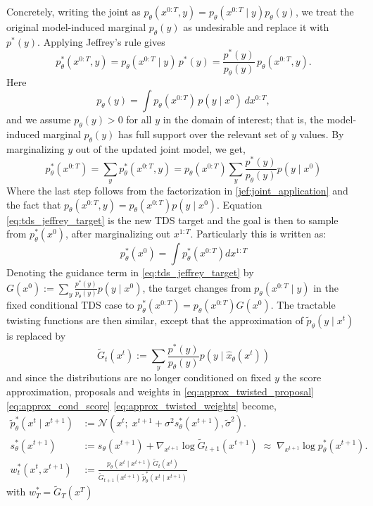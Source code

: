 Concretely, writing the joint as $p_\theta(x^{0:T},y)=p_\theta(x^{0:T}\mid y)p_\theta(y)$, we treat the original model-induced marginal $p_\theta(y)$ as undesirable and replace it with $p^*(y)$. Applying Jeffrey's rule gives
\begin{equation}
	p^*_\theta(x^{0:T},y)=p_\theta(x^{0:T}\mid y)\,p^*(y)
	=\frac{p^*(y)}{p_\theta(y)}\,p_\theta(x^{0:T},y).
	\label{jef:joint_application}
\end{equation}
Here
\[
	p_\theta(y)=\int p_\theta(x^{0:T})\,p(y\mid x^0)\,dx^{0:T},
\]
and we assume $p_\theta(y)>0$ for all $y$ in the domain of interest; that is, the model-induced marginal $p_\theta(y)$ has full support over the relevant set of $y$ values. By marginalizing $y$ out of the updated joint model, we get,
\begin{equation}
	p^*_\theta(x^{0:T}) = \sum_y p^*_\theta(x^{0:T},y) = p_\theta(x^{0:T})\sum_y\frac{p^*(y)}{p_\theta(y)}p(y \mid x^0) 
	\label{eq:tds_jeffrey_target}
\end{equation}
Where the last step follows from the factorization in \eqref{jef:joint_application} and the fact that $p_\theta(x^{0:T},y) = p_\theta(x^{0:T}) p(y \mid x^0)$. Equation \eqref{eq:tds_jeffrey_target} is the new TDS target and the goal is then to sample from $p^*_\theta(x^0)$, after marginalizing out $x^{1:T}$. Particularly this is written as:
\begin{equation}
	p^*_\theta(x^0) = \int p^*_\theta(x^{0:T})dx^{1:T}
\end{equation}
Denoting the guidance term in \eqref{eq:tds_jeffrey_target} by $G(x^0) := \sum_y\frac{p^*(y)}{p_\theta(y)}p(y \mid x^0)$, the target changes from $p_\theta(x^{0:T} \mid y)$ in the fixed conditional TDS case to $p^*_\theta(x^{0:T}) = p_\theta(x^{0:T})G(x^0)$. The tractable twisting functions are then similar, except that the approximation of $\tilde{p}_\theta(y \mid x^t)$ is replaced by
\begin{equation}
	\tilde{G}_t(x^t) := \sum_y\frac{p^*(y)}{p_\theta(y)}p(y \mid \hat{x}_\theta(x^t)) 
\end{equation}
and since the distributions are no longer conditioned on fixed $y$ the score approximation, proposals and weights in \ref{eq:approx_twisted_proposal} \ref{eq:approx_cond_score} \ref{eq:approx_twisted_weights} become,
\begin{align}
	\tilde p_\theta^*(x^t\mid x^{t+1}) &:= \mathcal N\!\left( x^t;\; x^{t+1}+\sigma^2 s_\theta^*(x^{t+1}), \tilde\sigma^2 \right).\label{jef:new_proposals}\\
	s_\theta^*(x^{t+1}) &:= s_\theta(x^{t+1}) + \nabla_{x^{t+1}}\log \tilde G_{t+1}(x^{t+1}) \;\approx\; \nabla_{x^{t+1}}\log p_\theta^*(x^{t+1}).
	\label{jef:new_score_approx}\\
	w_t^*(x^t,x^{t+1}) &:= \frac{ p_\theta(x^t\mid x^{t+1})\,\tilde G_t(x^t) }{ \tilde G_{t+1}(x^{t+1})\,\tilde p_\theta^*(x^t\mid x^{t+1}) }
	\label{jef:new_weights}
\end{align}
with $w^*_T = \tilde{G}_T(x^T)$


